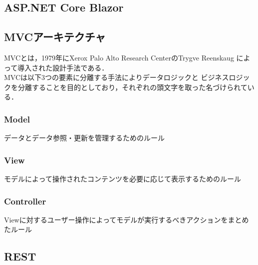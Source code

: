 \documentclass[11pt,a4paper]{jsarticle}
\begin{document}
\subsection{ASP.NET Core Blazor}

\subsection{MVCアーキテクチャ}
MVCとは，1979年にXerox Palo Alto Research CenterのTrygve Reenskaug
によって導入された設計手法である．\\
MVCは以下3つの要素に分離する手法によりデータロジックと
ビジネスロジックを分離することを目的としており，それぞれの頭文字を取った名づけられている．
\subsubsection{Model}
データとデータ参照・更新を管理するためのルール
\subsubsection{View}
モデルによって操作されたコンテンツを必要に応じて表示するためのルール
\subsubsection{Controller}
Viewに対するユーザー操作によってモデルが実行するべきアクションをまとめたルール

\subsection{REST}
\end{document}
